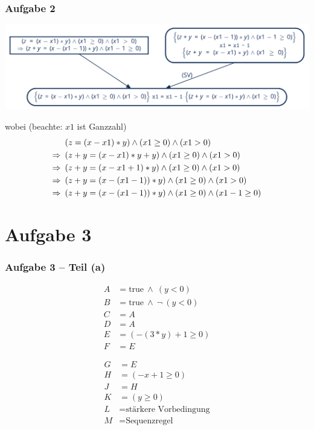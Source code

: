 \documentclass{beamer}
\newcommand{\logand}{ \ \land \ }
\begin{document}
\begin{frame} \frametitle{Aufgabe 2}
	\footnotesize
	\begin{center}
		\includegraphics[width=\linewidth]{tut12-abb}
	\end{center}
	wobei (beachte: $x1$ ist Ganzzahl)
	\begin{align*}
		&(z = (x - x1) * y) \land (x1 \ge 0) \land (x1 > 0) \\
		\Rightarrow \enskip &(z + y = (x - x1) * y + y) \land (x1 \ge 0) \land (x1 > 0) \\
		\Rightarrow \enskip &(z + y = (x - x1 + 1) * y) \land (x1 \ge 0) \land (x1 > 0) \\
		\Rightarrow \enskip &(z + y = (x - (x1 - 1)) * y) \land (x1 \ge 0) \land (x1 > 0) \\
		\Rightarrow \enskip &(z + y = (x - (x1 - 1)) * y) \land (x1 \ge 0) \land (x1 - 1 \ge 0)
	\end{align*}
\end{frame}

\section{Aufgabe 3}

\begin{frame} \frametitle{Aufgabe 3 -- Teil (a)}
	\begin{minipage}{\dimexpr0.5\linewidth-\fboxrule-\fboxsep}
		\begin{align*}
			A &= \text{true} \logand (y < 0) \\
			B &= \text{true} \logand \lnot \ (y < 0) \\
			C &= A \\
			D &= A \\
			E &= ( -(3*y) + 1 \ge 0) \\
			F &= E 
		\end{align*}
	\end{minipage}
	\begin{minipage}{\dimexpr0.5\linewidth-\fboxrule-\fboxsep}
		\begin{align*}
		G &= E \\
		H &= (-x + 1 \ge 0) \\
		J &= H \\
		K &= (y \ge 0) \\
		L &= \text{stärkere Vorbedingung} \\
		M &= \text{Sequenzregel} 
		\end{align*}
	\end{minipage}	
\end{frame}
\end{document}
